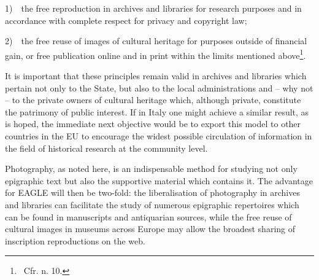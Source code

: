 \documentclass[amsthm,ebook]{saparticle}
\begin{document}
1)\ \ the free reproduction in archives and libraries for research purposes and in accordance with complete respect for
privacy and copyright law;

2)\ \ the free reuse of images of cultural heritage for purposes outside of financial gain, or free publication online
and in print within the limits mentioned above\footnote{\ Cfr. n. 10.}.

It is important that these principles remain valid in archives and libraries which pertain not only to the State, but
also to the local administrations and – why not – to the private owners of cultural heritage which, although private,
constitute the patrimony of public interest. If in Italy one might achieve a similar result, as is hoped, the immediate
next objective would be to export this model to other countries in the EU to encourage the widest possible circulation
of information in the field of historical research at the community level.

Photography, as noted here, is an indispensable method for studying not only epigraphic text but also the supportive
material which contains it. The advantage for EAGLE will then be two-fold: the liberalisation of photography in
archives and libraries can facilitate the study of numerous epigraphic repertoires which can be found in manuscripts
and antiquarian sources, while the free reuse of cultural images in museums across Europe may allow the broadest
sharing of inscription reproductions on the web.




\end{document}
